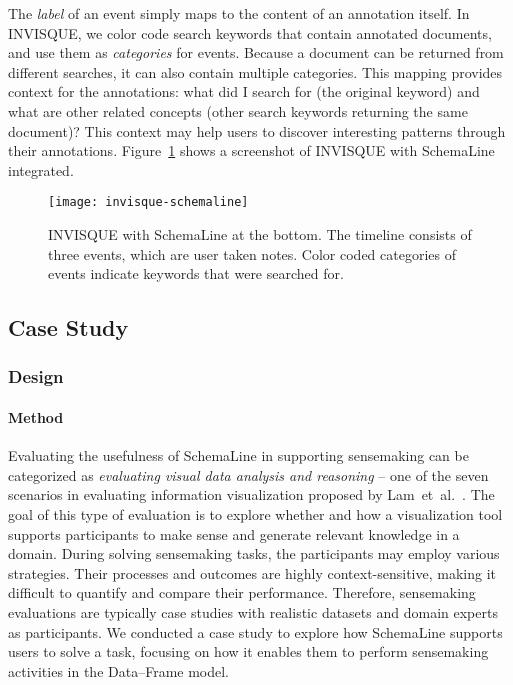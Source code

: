 The \emph{label} of an event simply maps to the content of an annotation itself. In INVISQUE, we color code search keywords that contain annotated documents, and use them as \emph{categories} for events. Because a document can be returned from different searches, it can also contain multiple categories. This mapping provides context for the annotations: what did I search for (the original keyword) and what are other related concepts (other search keywords returning the same document)? This context may help users to discover interesting patterns through their annotations. Figure~\ref{fig:invisque-schemaline} shows a screenshot of INVISQUE with SchemaLine integrated.

\begin{figure}[!htb]
	\centering
	\texttt{[image: invisque-schemaline]}
	\caption{INVISQUE with SchemaLine at the bottom. The timeline consists of three events, which are user taken notes. Color coded categories of events indicate keywords that were searched for.}
	\label{fig:invisque-schemaline}
\end{figure}

\subsection{Case Study}
\subsubsection{Design}
\paragraph{Method}
Evaluating the usefulness of SchemaLine in supporting sensemaking can be categorized as \emph{evaluating visual data analysis and reasoning} -- one of the seven scenarios in evaluating information visualization proposed by Lam~et~al.~\cite{Lam2012}. The goal of this type of evaluation is to explore whether and how a visualization tool supports participants to make sense and generate relevant knowledge in a domain. During solving sensemaking tasks, the participants may employ various strategies. Their processes and outcomes are highly context-sensitive, making it difficult to quantify and compare their performance. Therefore, sensemaking evaluations are typically case studies with realistic datasets and domain experts as participants. We conducted a case study to explore how SchemaLine supports users to solve a task, focusing on how it enables them to perform sensemaking activities in the Data--Frame model.

